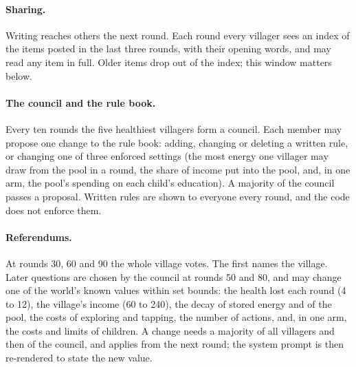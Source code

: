 \documentclass[11pt]{article}
\begin{document}
\paragraph{Sharing.} Writing reaches others the next round. Each round every villager sees an index
of the items posted in the last three rounds, with their opening words, and may read any item in
full. Older items drop out of the index; this window matters below.

\paragraph{The council and the rule book.} Every ten rounds the five healthiest villagers form a
council. Each member may propose one change to the rule book: adding, changing or deleting a written
rule, or changing one of three enforced settings (the most energy one villager may draw from the
pool in a round, the share of income put into the pool, and, in one arm, the pool's spending on each
child's education). A majority of the council passes a proposal. Written rules are shown to everyone
every round, and the code does not enforce them.

\paragraph{Referendums.} At rounds 30, 60 and 90 the whole village votes. The first names the
village. Later questions are chosen by the council at rounds 50 and 80, and may change one of the
world's known values within set bounds: the health lost each round (4 to 12), the village's income
(60 to 240), the decay of stored energy and of the pool, the costs of exploring and tapping, the
number of actions, and, in one arm, the costs and limits of children. A change needs a majority of
all villagers and then of the council, and applies from the next round; the system prompt is then
re-rendered to state the new value.
\end{document}
